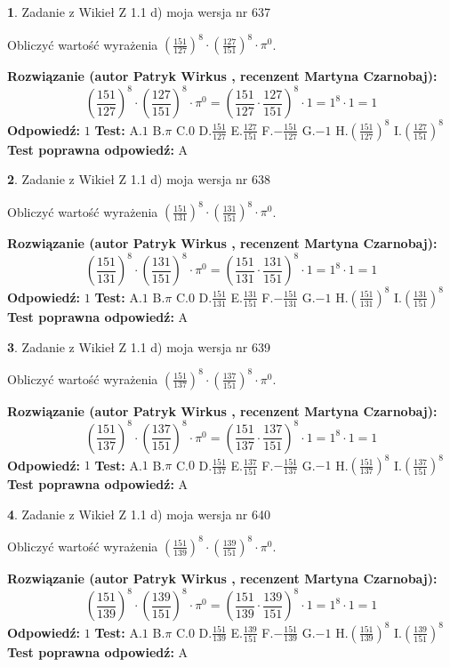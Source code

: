 \documentclass[12pt, a4paper]{article}
\theoremstyle{definition} %
\newtheorem{zad}{}
\newcommand{\zadStart}[1]{\begin{zad}#1\newline}
\newcommand{\zadStop}{\end{zad}}
\newcommand{\rozwStart}[2]{\noindent \textbf{Rozwiązanie (autor #1 , recenzent #2): }\newline}
\newcommand{\rozwStop}{\newline}
\newcommand{\odpStart}{\noindent \textbf{Odpowiedź:}\newline}
\newcommand{\odpStop}{\newline}
\newcommand{\testStart}{\noindent \textbf{Test:}\newline}
\newcommand{\testStop}{\newline}
\newcommand{\kluczStart}{\noindent \textbf{Test poprawna odpowiedź:}\newline}
\newcommand{\kluczStop}{\newline}
\begin{document}
\zadStart{Zadanie z Wikieł Z 1.1 d) moja wersja nr 637}

Obliczyć wartość wyrażenia $(\frac{151}{127})^{8} \cdot (\frac{127}{151})^{8} \cdot \pi^{0}$.
\zadStop
\rozwStart{Patryk Wirkus}{Martyna Czarnobaj}
$$(\frac{151}{127})^{8} \cdot (\frac{127}{151})^{8} \cdot \pi^{0} = (\frac{151}{127} \cdot \frac{127}{151})^{8} \cdot 1 = 1^{8} \cdot 1 = 1$$
\rozwStop
\odpStart
$1$
\odpStop
\testStart
A.$1$ B.$\pi$ C.$0$ D.$\frac{151}{127}$ E.$\frac{127}{151}$
F.$-\frac{151}{127}$ G.$-1$
H.$(\frac{151}{127})^{8}$
I.$(\frac{127}{151})^{8}$
\testStop
\kluczStart
A
\kluczStop



\zadStart{Zadanie z Wikieł Z 1.1 d) moja wersja nr 638}

Obliczyć wartość wyrażenia $(\frac{151}{131})^{8} \cdot (\frac{131}{151})^{8} \cdot \pi^{0}$.
\zadStop
\rozwStart{Patryk Wirkus}{Martyna Czarnobaj}
$$(\frac{151}{131})^{8} \cdot (\frac{131}{151})^{8} \cdot \pi^{0} = (\frac{151}{131} \cdot \frac{131}{151})^{8} \cdot 1 = 1^{8} \cdot 1 = 1$$
\rozwStop
\odpStart
$1$
\odpStop
\testStart
A.$1$ B.$\pi$ C.$0$ D.$\frac{151}{131}$ E.$\frac{131}{151}$
F.$-\frac{151}{131}$ G.$-1$
H.$(\frac{151}{131})^{8}$
I.$(\frac{131}{151})^{8}$
\testStop
\kluczStart
A
\kluczStop



\zadStart{Zadanie z Wikieł Z 1.1 d) moja wersja nr 639}

Obliczyć wartość wyrażenia $(\frac{151}{137})^{8} \cdot (\frac{137}{151})^{8} \cdot \pi^{0}$.
\zadStop
\rozwStart{Patryk Wirkus}{Martyna Czarnobaj}
$$(\frac{151}{137})^{8} \cdot (\frac{137}{151})^{8} \cdot \pi^{0} = (\frac{151}{137} \cdot \frac{137}{151})^{8} \cdot 1 = 1^{8} \cdot 1 = 1$$
\rozwStop
\odpStart
$1$
\odpStop
\testStart
A.$1$ B.$\pi$ C.$0$ D.$\frac{151}{137}$ E.$\frac{137}{151}$
F.$-\frac{151}{137}$ G.$-1$
H.$(\frac{151}{137})^{8}$
I.$(\frac{137}{151})^{8}$
\testStop
\kluczStart
A
\kluczStop



\zadStart{Zadanie z Wikieł Z 1.1 d) moja wersja nr 640}

Obliczyć wartość wyrażenia $(\frac{151}{139})^{8} \cdot (\frac{139}{151})^{8} \cdot \pi^{0}$.
\zadStop
\rozwStart{Patryk Wirkus}{Martyna Czarnobaj}
$$(\frac{151}{139})^{8} \cdot (\frac{139}{151})^{8} \cdot \pi^{0} = (\frac{151}{139} \cdot \frac{139}{151})^{8} \cdot 1 = 1^{8} \cdot 1 = 1$$
\rozwStop
\odpStart
$1$
\odpStop
\testStart
A.$1$ B.$\pi$ C.$0$ D.$\frac{151}{139}$ E.$\frac{139}{151}$
F.$-\frac{151}{139}$ G.$-1$
H.$(\frac{151}{139})^{8}$
I.$(\frac{139}{151})^{8}$
\testStop
\kluczStart
A
\kluczStop
\end{document}
